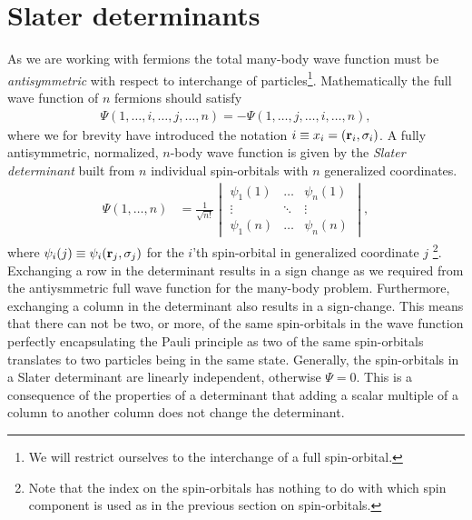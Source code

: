     \section{Slater determinants}
        As we are working with fermions the total many-body wave function must
        be \emph{antisymmetric} with respect to interchange of
        particles\footnote{We will restrict ourselves to the interchange of a
        full spin-orbital.}. Mathematically the full wave function of $n$
        fermions should satisfy
        \begin{align}
            \Psi(1, \dots, i, \dots, j, \dots, n)
            =
            -\Psi(1, \dots, j, \dots, i, \dots, n),
        \end{align}
        where we for brevity have introduced the notation $i \equiv x_i =
        (\mathbf{r}_i, \sigma_i)$. A fully antisymmetric, normalized, $n$-body wave
        function is given by the \emph{Slater determinant} built from $n$
        individual spin-orbitals with $n$ generalized coordinates.
        \begin{align}
            \Psi(1, \dots, n)
            &= \frac{1}{\sqrt{n!}}
            \begin{vmatrix}
                \psi_1(1) & \dots & \psi_n(1) \\
                \vdots & \ddots & \vdots \\
                \psi_1(n) & \dots & \psi_n(n)
            \end{vmatrix},
        \end{align}
        where $\psi_i(j) \equiv \psi_i(\mathbf{r}_j, \sigma_j)$ for the $i$'th
        spin-orbital in generalized coordinate $j$ \footnote{Note that the index
        on the spin-orbitals has nothing to do with which spin component is used
        as in the previous section on spin-orbitals.}. Exchanging a row in the
        determinant results in a sign change as we required from the
        antiysmmetric full wave function for the many-body problem. Furthermore,
        exchanging a column in the determinant also results in a sign-change.
        This means that there can not be two, or more, of the same spin-orbitals
        in the wave function perfectly encapsulating the Pauli principle as two
        of the same spin-orbitals translates to two particles being in the same
        state. Generally, the spin-orbitals in a Slater determinant are linearly
        independent, otherwise $\Psi = 0$. This is a consequence of the
        properties of a determinant that adding a scalar multiple of a column to
        another column does not change the determinant.

